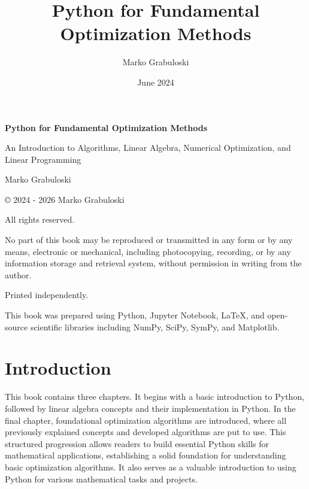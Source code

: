 \documentclass[11pt]{article}
\title{Python for Fundamental Optimization Methods}
\date{June 2024}
\author{Marko Grabuloski}
\begin{document}
    
    \begin{titlepage}
    \centering
    \vspace*{3cm}

    {\Huge\bfseries Python for Fundamental Optimization Methods\par}
    \vspace{1cm}

    {\Large An Introduction to Algorithms, Linear Algebra, Numerical Optimization, and Linear Programming\par}
    \vspace{2cm}

    {\Large Marko Grabuloski\par}
    \vfill

    \thispagestyle{empty}   
    \end{titlepage}
    
    

    
    

    \newpage
    \thispagestyle{empty}

© 2024 - 2026 Marko Grabuloski

All rights reserved.

No part of this book may be reproduced or transmitted in any form or by
any means, electronic or mechanical, including photocopying, recording,
or by any information storage and retrieval system, without permission
in writing from the author.

Printed independently.

This book was prepared using Python, Jupyter Notebook, LaTeX, and
open-source scientific libraries including NumPy, SciPy, SymPy, and
Matplotlib.

\newpage

    \tableofcontents

    \newpage

\section{Introduction}\label{introduction}

This book contains three chapters. It begins with a basic introduction
to Python, followed by linear algebra concepts and their implementation
in Python. In the final chapter, foundational optimization algorithms
are introduced, where all previously explained concepts and developed
algorithms are put to use. This structured progression allows readers to
build essential Python skills for mathematical applications,
establishing a solid foundation for understanding basic optimization
algorithms. It also serves as a valuable introduction to using Python
for various mathematical tasks and projects.
\end{document}

